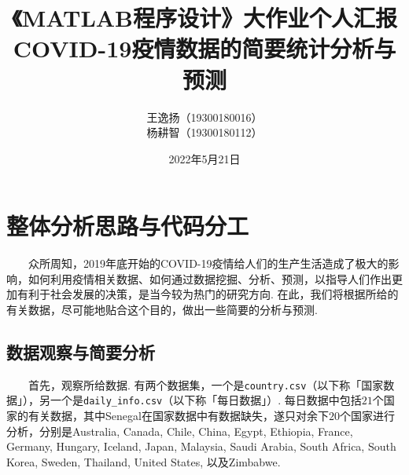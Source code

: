 \documentclass[a4paper, titlepage]{article}
\begin{document}
    \renewcommand{\thefootnote}{\fnsymbol{footnote}}
    \title{{\small《MATLAB程序设计》大作业个人汇报}\\COVID-19疫情数据的简要统计分析与预测\footnotemark[1]}
    \author{王逸扬（19300180016）\\杨耕智（19300180112）{\kaishu }}
    \date{2022年5月21日}
    \maketitle
    \renewcommand{\thefootnote}{\araboc{footnote}}
    \renewcommand{\contentsname}{\centering 目录}
    \tableofcontents

    \section{整体分析思路与代码分工}
        　　众所周知，2019年底开始的COVID-19疫情给人们的生产生活造成了极大的影响，如何利用疫情相关数据、如何通过数据挖掘、分析、预测，以指导人们作出更加有利于社会发展的决策，是当今较为热门的研究方向. 在此，我们将根据所给的有关数据，尽可能地贴合这个目的，做出一些简要的分析与预测.

        \subsection{数据观察与简要分析}
        　　首先，观察所给数据. 有两个数据集，一个是\texttt{country.csv}（以下称「国家数据」），另一个是\texttt{daily\_info.csv}（以下称「每日数据」）. 每日数据中包括$21$个国家的有关数据，其中Senegal在国家数据中有数据缺失，遂只对余下$20$个国家进行分析，分别是Australia, Canada, Chile, China, Egypt, Ethiopia, France, Germany, Hungary, Iceland, Japan, Malaysia, Saudi Arabia, South Africa, South Korea, Sweden, Thailand, United States, 以及Zimbabwe. 
\end{document}
